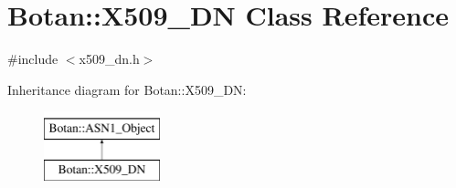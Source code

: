 \hypertarget{classBotan_1_1X509__DN}{\section{Botan\-:\-:X509\-\_\-\-D\-N Class Reference}
\label{classBotan_1_1X509__DN}
}


{\ttfamily \#include $<$x509\-\_\-dn.\-h$>$}

Inheritance diagram for Botan\-:\-:X509\-\_\-\-D\-N\-:\begin{figure}[H]
\begin{center}
\leavevmode
\includegraphics[height=2.000000cm]{classBotan_1_1X509__DN}
\end{center}
\end{figure}
